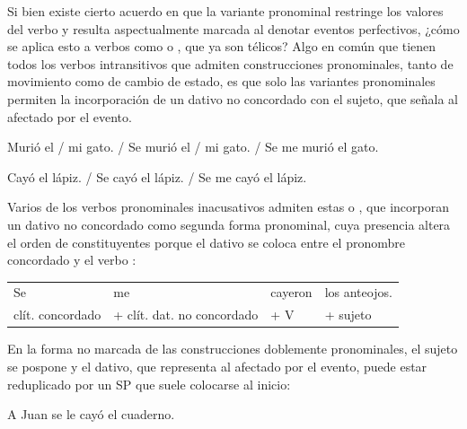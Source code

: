 Si bien existe cierto acuerdo en que la variante pronominal restringe los
valores del verbo y resulta aspectualmente marcada al denotar eventos
perfectivos, ¿cómo se aplica esto a verbos como  o
, que ya son télicos? Algo en común que tienen todos los verbos
intransitivos que admiten construcciones pronominales, tanto de movimiento como
de cambio de estado, es que solo las variantes pronominales permiten la
incorporación de un dativo no concordado con el sujeto, que señala al afectado
por el evento.

\begin{exe}
  \ex\label{ex:10-gato}
    \begin{xlist}
      \ex Murió el / mi gato. / 
      \ex\label{ex:10-gato-b} Se murió el / mi gato. / Se me murió el gato.
    \end{xlist}
  \ex\label{ex:10-lapiz}
    \begin{xlist}
      \ex Cayó el lápiz. / 
      \ex\label{ex:10-lapiz-b} Se cayó el lápiz. / Se me cayó el lápiz.
    \end{xlist}
\end{exe}

Varios de los verbos pronominales inacusativos admiten estas
 o , que
incorporan un dativo no concordado como segunda forma pronominal, cuya presencia
altera el orden de constituyentes porque el dativo se coloca entre el pronombre
concordado y el verbo :

\begin{exe}
  \ex\label{ex:10-anteojos}
      \begin{tabular}[t]{@{}llll@{}}
        Se & me & cayeron & los anteojos. \\
        \footnotesize clít. concordado & \footnotesize + clít. dat. no
          concordado & \footnotesize + V & \footnotesize + sujeto \\
      \end{tabular}
\end{exe}

En la forma no marcada de las construcciones doblemente pronominales, el sujeto
se pospone y el dativo, que representa al afectado por el evento, puede estar
reduplicado por un SP que suele colocarse al inicio:

\begin{exe}
  \ex A Juan se le cayó el cuaderno.
\end{exe}

